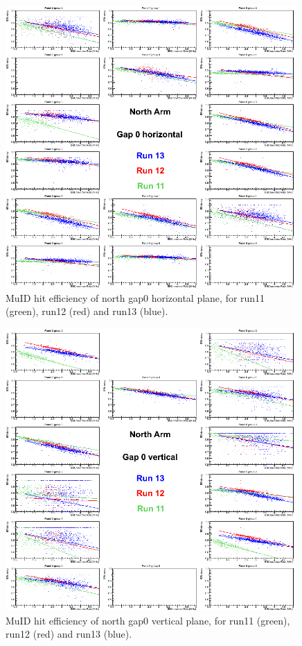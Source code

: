 \begin{center}
  \begin{figure}[p]
    \includegraphics[width=0.99\textwidth]{./figures/efficomp_North_gap0_horizontal.png}
    \caption{\label{Fig:efficiency:MuIdEff:a1g0p0}MuID hit efficiency of north gap0 horizontal plane, for run11 (green), run12 (red) and run13 (blue).}
  \end{figure}
\end{center}
\begin{center}
  \begin{figure}[p]
    \includegraphics[width=0.99\textwidth]{./figures/efficomp_North_gap0_vertical.png}
    \caption{\label{Fig:efficiency:MuIdEff:a1g0p1}MuID hit efficiency of north gap0 vertical plane, for run11 (green), run12 (red) and run13 (blue).}
  \end{figure}
\end{center}
